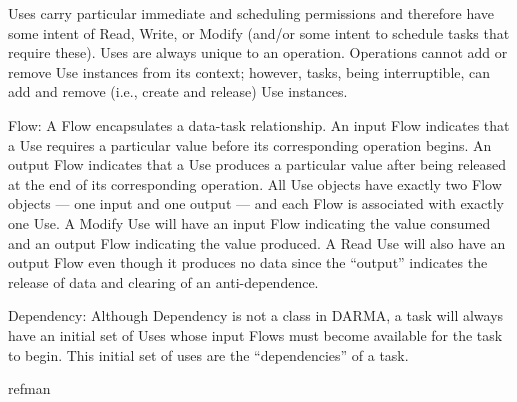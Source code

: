 \begin{compactdesc}
Uses carry particular immediate and scheduling permissions and therefore have some intent of Read, Write, or Modify (and/or some intent to schedule tasks that require these).
  Uses are always unique to an \gls{operation}.
Operations cannot add or remove Use instances from its context;
however, tasks, being interruptible, can add and remove (i.e., create and release) Use instances.
\item [Flow:] A Flow encapsulates a data-task relationship. 
An input Flow indicates that a Use requires a particular value before its
corresponding \gls{operation} begins.
An output Flow indicates that a Use produces a particular value after being
released at the end of its corresponding \gls{operation}.
All Use objects have exactly two Flow objects --- one input and one output ---
and each Flow is associated with exactly one Use.
A Modify Use will have an input Flow indicating the value consumed and an output Flow indicating the value produced.
A Read Use will also have an output Flow even though it produces no data since the ``output'' indicates the release of data and clearing of an anti-dependence.
\item [Dependency:] Although Dependency is not a class in \gls{DARMA}, a
  \gls{task} will always have an initial set of Uses whose input Flows must become
  available for the \gls{task} to begin.
  This initial set of uses are the ``dependencies'' of a \gls{task}.
\end{compactdesc} 

{refman}
